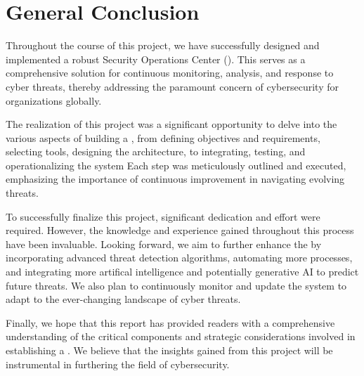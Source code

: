 \thispagestyle{plain} %
\section*{General Conclusion}
Throughout the course of this project, we have successfully designed and implemented a robust Security Operations Center ().
This  serves as a comprehensive solution for continuous monitoring, analysis, and response to cyber threats, thereby addressing the paramount concern of cybersecurity for organizations globally.

The realization of this project was a significant opportunity to delve into the various aspects of building a , from defining objectives and requirements, selecting tools, designing the architecture, to integrating, testing, and operationalizing the system
Each step was meticulously outlined and executed, emphasizing the importance of continuous improvement in navigating evolving threats.

To successfully finalize this project, significant dedication and effort were required.
However, the knowledge and experience gained throughout this process have been invaluable.
Looking forward, we aim to further enhance the  by incorporating advanced threat detection algorithms, automating more processes, and integrating more artifical intelligence and potentially generative AI to predict future threats.
We also plan to continuously monitor and update the system to adapt to the ever-changing landscape of cyber threats.

Finally, we hope that this report has provided readers with a comprehensive understanding of the critical components and strategic considerations involved in establishing a . We believe that the insights gained from this project will be instrumental in furthering the field of cybersecurity.
